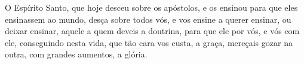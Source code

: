 O Espírito Santo, que hoje desceu sobre os apóstolos, e os ensinou para
que eles ensinassem ao mundo, desça sobre todos vós, e vos ensine a
querer ensinar, ou deixar ensinar, aquele a quem deveis a doutrina, para
que ele por vós, e vós com ele, conseguindo nesta vida, que tão cara
vos custa, a graça, mereçais gozar na outra, com grandes aumentos, a
glória.



